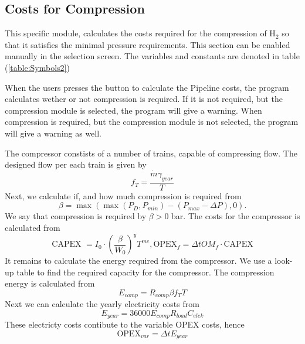 \documentclass{article}
\begin{document}
\subsection{Costs for Compression}
This specific module, calculates the costs required for the compression of H$_2$ so that it satisfies the minimal pressure requirements. This section can be enabled manually in the selection screen. The variables and constants are denoted in table (\ref{table:Symbols2})
\begin{info}
When the users presses the button to calculate the Pipeline costs, the program calculates wether or not compression is required. If it is not required, but the compression module is selected, the program will give a warning. When compression is required, but the compression module is not selected, the program will give a warning as well. 
\end{info}
The compressor constists of a number of trains, capable of compressing flow. The designed flow per each train is given by 
\begin{equation}
f_T = \frac{\dot{m}\gamma_{year}}{T}
\end{equation}
Next, we calculate if, and how much compression is required from
\begin{equation}
\beta = \max \left( \max (P_D, P_{min}) - (P_{max} - \Delta P)  , 0 \right).
\end{equation}
We say that compression is required by $\beta >0$ bar. 
The costs for the compressor is calculated from
\begin{equation}
\text{CAPEX } = I_0\cdot\left(\frac{\beta}{W_0}\right)^yT^{me}, \text{OPEX}_f =\Delta t OM_f\cdot \text{CAPEX}
\end{equation}
It remains to calculate the energy required from the compressor. We use a look-up table to find the required capacity for the compressor. The compression energy is calculated from
\begin{equation}
E_{comp} = R_{comp}\beta f_TT 
\end{equation}
Next we can calculate the yearly electricity costs from
\begin{equation}
E_{year} = 36000 E_{comp}R_{load}C_{elek}
\end{equation}
These electricty costs contibute to the variable OPEX costs, hence
\begin{equation}
\text{OPEX}_{var} = \Delta t E_{year}
\end{equation}
\end{document}

